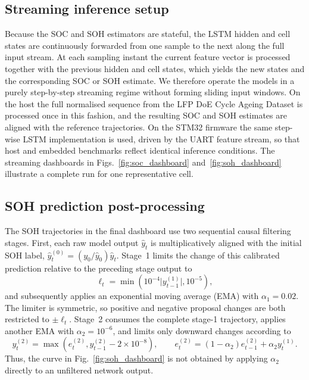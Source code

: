 \documentclass[final,3p,times]{elsarticle}
\begin{document}
\subsection{Streaming inference setup}
Because the SOC and SOH estimators are stateful, the LSTM hidden and cell states are continuously forwarded from one sample to the next along the full input stream. At each sampling instant the current feature vector is processed together with the previous hidden and cell states, which yields the new states and the corresponding SOC or SOH estimate. We therefore operate the models in a purely step-by-step streaming regime without forming sliding input windows. On the host the full normalised sequence from the LFP DoE Cycle Ageing Dataset is processed once in this fashion, and the resulting SOC and SOH estimates are aligned with the reference trajectories. On the STM32 firmware the same step-wise LSTM implementation is used, driven by the UART feature stream, so that host and embedded benchmarks reflect identical inference conditions. The streaming dashboards in Figs.~\ref{fig:soc_dashboard} and~\ref{fig:soh_dashboard} illustrate a complete run for one representative cell.
\subsection{SOH prediction post-processing}\label{sec:soh_filter_method}
The SOH trajectories in the final dashboard use two sequential causal filtering stages. First, each raw model output $\hat y_t$ is multiplicatively aligned with the initial SOH label, $\hat y_t^{(0)}=(y_0/\hat y_0)\hat y_t$. Stage~1 limits the change of this calibrated prediction relative to the preceding stage output to
\begin{equation}
    \ell_t = \min\!\left(10^{-4}\lvert y_{t-1}^{(1)}\rvert,10^{-5}\right),
\end{equation}
and subsequently applies an exponential moving average (EMA) with $\alpha_1=0.02$. The limiter is symmetric, so positive and negative proposal changes are both restricted to $\pm\ell_t$. Stage~2 consumes the complete stage-1 trajectory, applies another EMA with $\alpha_2=10^{-6}$, and limits only downward changes according to
\begin{equation}
    y_t^{(2)}=\max\!\left(e_t^{(2)},y_{t-1}^{(2)}-2\times10^{-8}\right),\qquad
    e_t^{(2)}=(1-\alpha_2)e_{t-1}^{(2)}+\alpha_2 y_t^{(1)}.
\end{equation}
Thus, the curve in Fig.~\ref{fig:soh_dashboard} is not obtained by applying $\alpha_2$ directly to an unfiltered network output.
\end{document}
